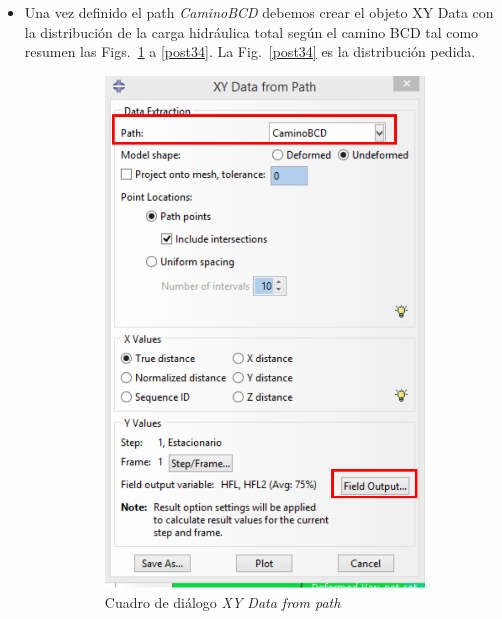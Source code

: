 \begin{itemize}
\item Una vez definido el path \textit{CaminoBCD} debemos crear el
  objeto XY Data con la distribución de la carga hidráulica total
  según el camino BCD tal como resumen las Figs.~\ref{post31} a
  \ref{post34}.  La Fig.~\ref{post34} es la distribución pedida.
  \begin{figure}[!h]
    \centering
    \begin{subfigure}[!h]{0.33\textwidth}
      \includegraphics[width=\textwidth]{./body/images/post31.pdf}
      \caption{Cuadro de diálogo \textit{XY Data from path}}
      \label{post31}
    \end{subfigure}%
    \begin{subfigure}[!h]{0.33\textwidth}

\end{subfigure}
\end{figure}
\end{itemize}
